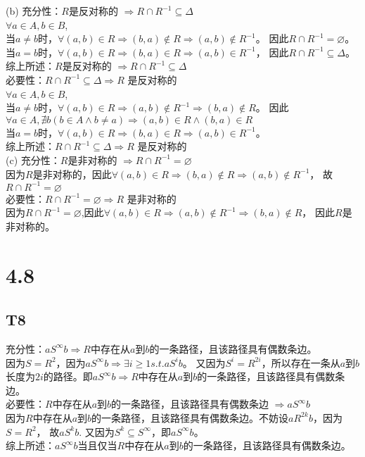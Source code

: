 \documentclass{article}
\begin{document}
(b) 充分性：$R$是反对称的 $\Rightarrow R \cap R^{-1} \subseteq \Delta$\\
$\forall a \in A, b \in B$,\\
当$a \neq b$时，$\forall (a, b) \in R \Rightarrow (b, a) \notin R \Rightarrow (a, b) \notin R^{-1}$。
因此$R \cap R^{-1} = \varnothing$。\\
当$a = b$时，$\forall (a, b) \in R \Rightarrow (b, a) \in R \Rightarrow (a, b) \in R^{-1}$，
因此$R \cap R^{-1} \subseteq \Delta$。\\
综上所述：$R$是反对称的 $\Rightarrow R \cap R^{-1} \subseteq \Delta$\\
必要性：$R \cap R^{-1} \subseteq \Delta \Rightarrow R$ 是反对称的\\
$\forall a \in A, b \in B$,\\
当$a \neq b$时，$\forall (a, b) \in R \Rightarrow (a, b) \notin R^{-1} \Rightarrow (b, a) \notin R$。
因此$\forall a \in A, \nexists b(b \in A \land b \neq a) \Rightarrow (a, b) \in R \land (b, a) \in R$\\
当$a = b$时，$\forall (a, b) \in R \Rightarrow (b, a) \in R \Rightarrow (a, b) \in R^{-1}$。\\
综上所述：$R \cap R^{-1} \subseteq \Delta \Rightarrow R$ 是反对称的\\
(c) 充分性：$R$是非对称的 $\Rightarrow R \cap R^{-1} = \varnothing$\\
因为$R$是非对称的，因此$\forall (a, b) \in R \Rightarrow (b, a) \notin R \Rightarrow (a, b) \notin R^{-1}$，
故$R \cap R^{-1} = \varnothing$\\
必要性：$R \cap R^{-1} = \varnothing \Rightarrow R$ 是非对称的\\
因为$R \cap R^{-1} = \varnothing$,因此$\forall (a, b) \in R \Rightarrow (a, b) \notin R^{-1} \Rightarrow (b, a) \notin R$，
因此$R$是非对称的。\\
\section{4.8}
\subsection{T8}
充分性：$a S^{\infty} b \Rightarrow R$中存在从$a$到$b$的一条路径，且该路径具有偶数条边。\\
因为$S = R^2$，因为$a S^{\infty}b \Rightarrow \exists i \geq 1 s.t. a S^i b$。
又因为$S^i = R^{2i}$，所以存在一条从$a$到$b$长度为$2i$的路径。即$a S^{\infty} b \Rightarrow R$中存在从$a$到$b$的一条路径，且该路径具有偶数条边。\\
必要性：$R$中存在从$a$到$b$的一条路径，且该路径具有偶数条边 $\Rightarrow a S^{\infty} b $\\
因为$R$中存在从$a$到$b$的一条路径，且该路径具有偶数条边。不妨设$aR^{2k}b$，因为$S = R^2$，
故$a S^k b$. 又因为$S^k \subseteq S^{\infty}$，即$a S^{\infty} b$。\\
综上所述：$a S^{\infty} b $当且仅当$ R$中存在从$a$到$b$的一条路径，且该路径具有偶数条边。
\end{document}
